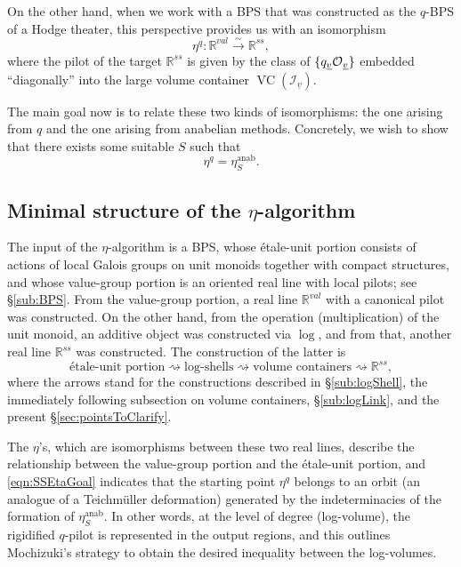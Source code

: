 \documentclass[12pt, reqno, a4paper]{amsart}
\def\udl#1{\underline{#1}} %
\def\simlongto{\stackrel{\sim}{\longrightarrow}} %
\def\bR{\mathbb{R}} %
\def\cI{{\mathcal{I}}}
\def\uv{\udl{v}} %
\DeclareMathOperator{\VC}{VC}
\begin{document}
On the other hand, when we work with a BPS that was constructed as the $q$-BPS of a Hodge theater, this perspective provides us with an isomorphism 
\[ \eta^q : \bR^{val} \simlongto \bR^{ss}, \]
where the pilot of the target $\bR^{ss}$ is given by the class of $\{q_{\uv}\OO_{\uv}\}$ embedded ``diagonally'' into the large volume container $\VC(\cI_{\uv})$.

The main goal now is to relate these two kinds of isomorphisms: the one arising from $q$ and the one arising from anabelian methods. 
Concretely, we wish to show that there exists some suitable $S$ such that 
\begin{equation}\label{eqn:SSEtaGoal}
\eta^q = \eta^{\mathrm{anab}}_S. 
\end{equation}

\subsection{Minimal structure of the $\eta$-algorithm}\label{sub:SSEtaStructure}
The input of the $\eta$-algorithm is a BPS, whose {\'e}tale-unit portion consists of actions of local Galois groups on unit monoids together with compact structures, and whose value-group portion is an oriented real line with local pilots; see \S\ref{sub:BPS}.
From the value-group portion, a real line $\bR^{val}$ with a canonical pilot was constructed. On the other hand, from the operation (multiplication) of the unit monoid, an additive object was constructed via $\log$, and from that, another real line $\bR^{ss}$ was constructed. The construction of the latter is
\[
  \text{{\'e}tale-unit portion}
  \rightsquigarrow
  \text{log-shells}
  \rightsquigarrow
  \text{volume containers}
  \rightsquigarrow
  \bR^{ss},
\]
where the arrows stand for the constructions described in \S\ref{sub:logShell}, the immediately following subsection on volume containers, \S\ref{sub:logLink}, and the present \S\ref{sec:pointsToClarify}.  

The $\eta$'s, which are isomorphisms between these two real lines, describe the relationship between the value-group portion and the \'etale-unit portion, and \eqref{eqn:SSEtaGoal} indicates that the starting point $\eta^q$ belongs to an orbit (an analogue of a Teichm\"uller deformation) generated by the indeterminacies of the formation of $\eta^{\mathrm{anab}}_S$. In other words, at the level of degree (log-volume), the rigidified $q$-pilot is represented in the output regions, and this outlines Mochizuki's strategy to obtain the desired inequality between the log-volumes.
\end{document}
